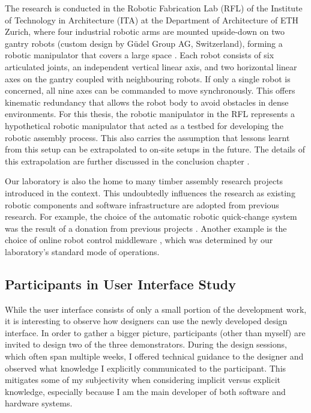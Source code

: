 The research is conducted in the Robotic Fabrication Lab (RFL) of the Institute of Technology in Architecture (ITA) at the Department of Architecture of ETH Zurich, where four industrial robotic arms are mounted upside-down on two gantry robots (custom design by Güdel Group AG, Switzerland), forming a robotic manipulator that covers a large space . Each robot consists of six articulated joints, an independent vertical linear axis, and two horizontal linear axes on the gantry coupled with neighbouring robots. If only a single robot is concerned, all nine axes can be commanded to move synchronously. This offers kinematic redundancy that allows the robot body to avoid obstacles in dense environments. For this thesis, the robotic manipulator in the RFL represents a hypothetical robotic manipulator that acted as a testbed for developing the robotic assembly process. This also carries the assumption that lessons learnt from this setup can be extrapolated to on-site setups in the future. The details of this extrapolation are further discussed in the conclusion chapter . 

Our laboratory is also the home to many timber assembly research projects introduced in the context. This undoubtedly influences the research as existing robotic components and software infrastructure are adopted from previous research. For example, the choice of the automatic robotic quick-change system was the result of a donation from previous projects . Another example is the choice of online robot control middleware , which was determined by our laboratory's standard mode of operations.

\subsection{Participants in User Interface Study}
\label{subsection:methodology-participants-in-user-interface-study}

While the user interface consists of only a small portion of the development work, it is interesting to observe how designers can use the newly developed design interface. In order to gather a bigger picture, participants (other than myself) are invited to design two of the three demonstrators. During the design sessions, which often span multiple weeks, I offered technical guidance to the designer and observed what knowledge I explicitly communicated to the participant. This mitigates some of my subjectivity when considering implicit versus explicit knowledge, especially because I am the main developer of both software and hardware systems. 

